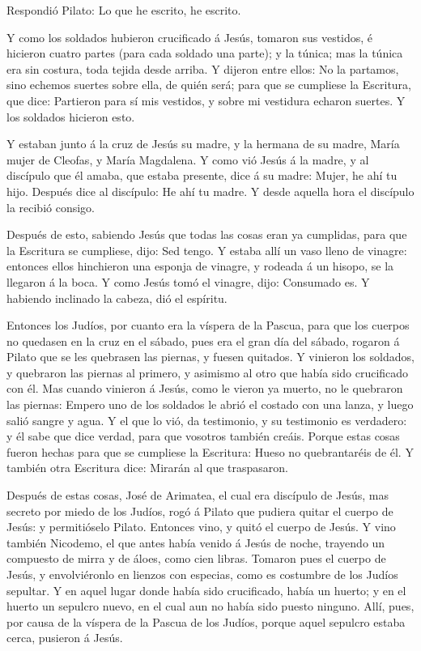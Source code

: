  Respondió Pilato: Lo que he escrito, he escrito.

 Y como los soldados hubieron crucificado á Jesús, tomaron
sus vestidos, é hicieron cuatro partes (para cada soldado una parte); y
la túnica; mas la túnica era sin costura, toda tejida desde arriba.
 Y dijeron entre ellos: No la partamos, sino echemos
suertes sobre ella, de quién será; para que se cumpliese la Escritura,
que dice: Partieron para sí mis vestidos, y sobre mi vestidura echaron
suertes. Y los soldados hicieron esto.

 Y estaban junto á la cruz de Jesús su madre, y la hermana
de su madre, María mujer de Cleofas, y María Magdalena.  Y
como vió Jesús á la madre, y al discípulo que él amaba, que estaba
presente, dice á su madre: Mujer, he ahí tu hijo.  Después
dice al discípulo: He ahí tu madre. Y desde aquella hora el discípulo la
recibió consigo.

 Después de esto, sabiendo Jesús que todas las cosas eran
ya cumplidas, para que la Escritura se cumpliese, dijo: Sed tengo.
 Y estaba allí un vaso lleno de vinagre: entonces ellos
hinchieron una esponja de vinagre, y rodeada á un hisopo, se la llegaron
á la boca.  Y como Jesús tomó el vinagre, dijo: Consumado
es. Y habiendo inclinado la cabeza, dió el espíritu.

 Entonces los Judíos, por cuanto era la víspera de la
Pascua, para que los cuerpos no quedasen en la cruz en el sábado, pues
era el gran día del sábado, rogaron á Pilato que se les quebrasen las
piernas, y fuesen quitados.  Y vinieron los soldados, y
quebraron las piernas al primero, y asimismo al otro que había sido
crucificado con él.  Mas cuando vinieron á Jesús, como le
vieron ya muerto, no le quebraron las piernas:  Empero uno
de los soldados le abrió el costado con una lanza, y luego salió sangre
y agua.  Y el que lo vió, da testimonio, y su testimonio es
verdadero: y él sabe que dice verdad, para que vosotros también creáis.
 Porque estas cosas fueron hechas para que se cumpliese la
Escritura: Hueso no quebrantaréis de él.  Y también otra
Escritura dice: Mirarán al que traspasaron.

 Después de estas cosas, José de Arimatea, el cual era
discípulo de Jesús, mas secreto por miedo de los Judíos, rogó á Pilato
que pudiera quitar el cuerpo de Jesús: y permitióselo Pilato. Entonces
vino, y quitó el cuerpo de Jesús.  Y vino también Nicodemo,
el que antes había venido á Jesús de noche, trayendo un compuesto de
mirra y de áloes, como cien libras.  Tomaron pues el cuerpo
de Jesús, y envolviéronlo en lienzos con especias, como es costumbre de
los Judíos sepultar.  Y en aquel lugar donde había sido
crucificado, había un huerto; y en el huerto un sepulcro nuevo, en el
cual aun no había sido puesto ninguno.  Allí, pues, por
causa de la víspera de la Pascua de los Judíos, porque aquel sepulcro
estaba cerca, pusieron á Jesús.

